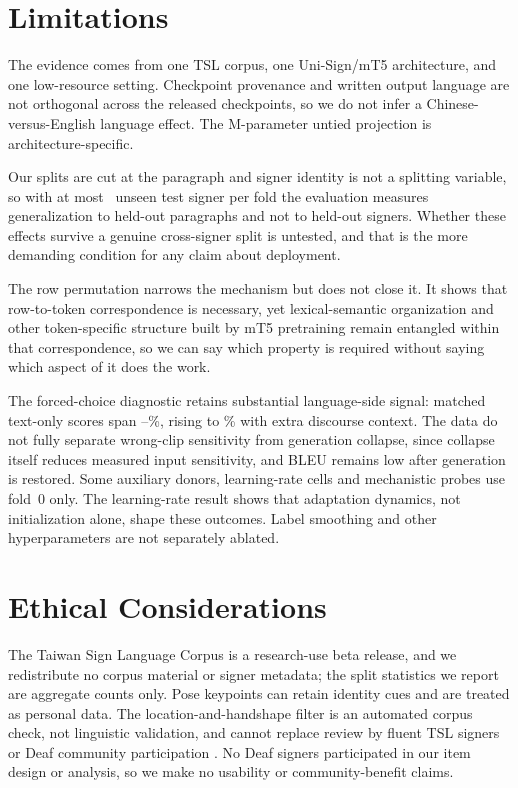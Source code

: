 \documentclass[11pt]{article}
\begin{document}
\section*{Limitations}

The evidence comes from one TSL corpus, one Uni-Sign/mT5 architecture, and one
low-resource setting. Checkpoint provenance and written output language are not
orthogonal across the released checkpoints, so we do not infer a
Chinese-versus-English language effect. The \HeadParamsM{}M-parameter untied
projection is architecture-specific.

Our splits are cut at the paragraph and signer identity is not a splitting
variable, so with at most \SplitTestSignersUnseen\ unseen test signer per fold
the evaluation measures generalization to held-out paragraphs and not to held-out
signers. Whether these effects survive a genuine cross-signer split is untested,
and that is the more demanding condition for any claim about deployment.

The row permutation narrows the mechanism but does not close it. It shows that
row-to-token correspondence is necessary, yet lexical-semantic organization and
other token-specific structure built by mT5 pretraining remain entangled within
that correspondence, so we can say which property is required without saying
which aspect of it does the work.

The forced-choice diagnostic retains substantial language-side signal: matched
text-only scores span \LexMajority--\LexLMpriorSum\%, rising to \LexLMcontext\%
with extra discourse context. The data do not fully separate wrong-clip
sensitivity from generation collapse, since collapse itself reduces measured
input sensitivity, and BLEU remains low after generation is restored. Some
auxiliary donors, learning-rate cells and mechanistic probes use fold~0 only. The
learning-rate result shows that adaptation dynamics, not initialization alone,
shape these outcomes. Label smoothing and other hyperparameters are not
separately ablated.

\section*{Ethical Considerations}

The Taiwan Sign Language Corpus \citep{tslcorpus} is a research-use beta release,
and we redistribute no corpus material or signer metadata; the split statistics
we report are aggregate counts only. Pose keypoints can retain identity cues and
are treated as personal data. The location-and-handshape filter is an automated
corpus check, not linguistic validation, and cannot replace review by fluent TSL
signers or Deaf community participation \citep{yin2021signed,mullergloss}. No
Deaf signers participated in our item design or analysis, so we make no usability
or community-benefit claims.
\end{document}

